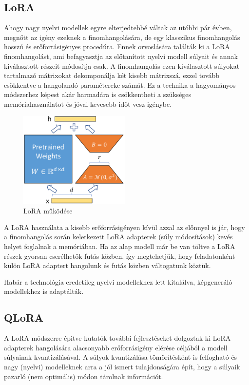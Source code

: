 \subsection{LoRA}

Ahogy nagy nyelvi modellek egyre elterjedtebbé váltak az utóbbi pár évben, megnőtt az igény ezeknek a finomhangolására, de egy klasszikus finomhangolás hosszú és erőforrásigényes procedúra. Ennek orvoslására találták ki a LoRA \cite{hu2022lora} finomhangolást, ami befagyasztja az előtanított nyelvi modell súlyait és annak kiválasztott részeit módosítja csak. A finomhangolás ezen kiválasztott súlyokat tartalmazó mátrixokat dekomponálja két kisebb mátrixszá, ezzel tovább csökkentve a hangolandó paramétereke számát. Ez a technika a hagyományos módszerhez képest akár harmadára is csökkentheti a szükséges memóriahasználatot és jóval kevesebb időt vesz igénybe.

\begin{figure}[H]
	\centering
	\includegraphics[width=0.49\textwidth]{figures/figure1.pdf}
	\caption{LoRA működése \cite{hu2022lora}}
\end{figure}

A LoRA használata a kisebb erőforrásigényen kívül azzal az előnnyel is jár, hogy a finomhangolás során keletkezett LoRA adapterek (súly módosítások) kevés helyet foglalnak a memóriában. Ha az alap modell már be van töltve a LoRA részek gyorsan cserélhetők futás közben, így megtehetjük, hogy feladatonként külön LoRA adaptert hangolunk és futás közben váltogatunk köztük.

Habár a technológia eredetileg nyelvi modellekhez lett kitalálva, képgeneráló modellekhez is adaptálták.

\subsection{QLoRA}

A LoRA módszerre épitve kutatók további fejlesztéseket dolgoztak ki LoRA adapterek hangolására alacsonyabb erőforrásigény elérése céljából a modell súlyainak kvantizálásával. A súlyok kvantizálása tömörítésként is felfogható és nagy (nyelvi) modelleknek arra a jól ismert tulajdonságára épít, hogy a súlyaik pazarló (nem optimális) módon tárolnak információt.

